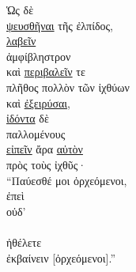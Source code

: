 {\large
\begin{greek}
\noindent Ὡς δὲ \\
\tabto{2em} \underline{ψευσθῆναι} τῆς ἐλπίδος, \\
\underline{λαβεῖν} \\
\tabto{2em} ἀμφίβληστρον \\
καὶ \underline{περιβαλεῖν} τε \\
\tabto{2em} πλῆθος πολλὸν τῶν ἰχθύων \\
καὶ \underline{ἐξειρύσαι}, \\
\underline{ἰδόντα} δὲ \\
\tabto{2em} παλλομένους \\
\underline{εἰπεῖν} ἄρα \underline{αὐτὸν} \\
\tabto{2em} πρὸς τοὺς ἰχθῦς· \\
``Παύεσθέ μοι ὀρχεόμενοι, \\
\tabto{2em} ἐπεὶ \\
\tabto{2em} οὐδ' \\
\tabto{4em}  \\
\tabto{2em} ἠθέλετε \\
\tabto{4em} ἐκβαίνειν [ὀρχεόμενοι].''\\

\end{greek}
}

